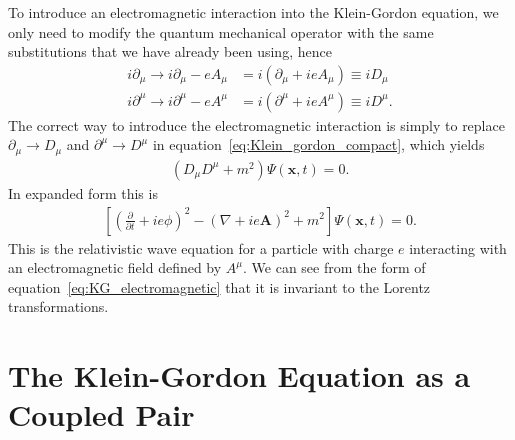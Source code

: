 \documentclass[titlepage,letterpaper,onecolumn,11pt,final]{report}
\numberwithin{equation}{section}
\numberwithin{figure}{section}
\begin{document}
To introduce an electromagnetic interaction into the Klein-Gordon equation, we only need to modify the quantum mechanical operator with the same substitutions that we have already been using, hence
\begin{subequations}
\begin{align}
	i \partial_{\mu} \rightarrow i \partial_{\mu} - e A_{\mu} &= i \left(\partial_{\mu} + i e A_{\mu} \right) \equiv i D_{\mu} \\
	i \partial^{\mu} \rightarrow i \partial^{\mu} - e A^{\mu} &= i \left(\partial^{\mu} + i e A^{\mu} \right) \equiv i D^{\mu} .
\end{align}
\end{subequations}
%
The correct way to introduce the electromagnetic interaction is simply to replace $\partial_{\mu} \rightarrow D_{\mu}$ and $\partial^{\mu} \rightarrow D^{\mu}$ in equation~\ref{eq:Klein_gordon_compact}, which yields
\begin{gather}
	\label{eq:KG_electromagnetic}
	\left( D_{\mu} D^{\mu} + m^{2} \right) \Psi (\mathbf{x}, t) = 0.
\end{gather}
In expanded form this is
\begin{gather}
	\label{eq:KG_electromagnetic_explicit}
	\left[ \left( \frac{\partial}{\partial t} + i e \phi \right)^{2} - \left( \nabla + i e \mathbf{A} \right)^{2} + m^{2} \right] \Psi (\mathbf{x},t) = 0 .
\end{gather}
This is the relativistic wave equation for a particle with charge $e$ interacting with an electromagnetic field defined by $A^{\mu}$. We can see from the form of equation~\ref{eq:KG_electromagnetic} that it is invariant to the Lorentz transformations.

\section{The Klein-Gordon Equation as a Coupled Pair}
\end{document}
